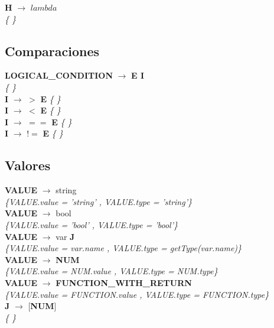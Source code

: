 \documentclass[10pt,a4paper]{article}
\begin{document}
\textbf{H} $\rightarrow$ $lambda$ \\
\textit{\{   \}} \\

\subsection{Comparaciones}
\textbf{LOGICAL\_CONDITION} $\rightarrow$ \textbf{E I} \\
\textit{\{   \}} \\

\textbf{I} $\rightarrow$ $>$ \textbf{E}
\textit{\{   \}} \\

\textbf{I} $\rightarrow$ $<$ \textbf{E}
\textit{\{   \}} \\

\textbf{I} $\rightarrow$ $==$ \textbf{E}
\textit{\{   \}} \\

\textbf{I} $\rightarrow$ $!=$ \textbf{E}
\textit{\{   \}} \\

\subsection{Valores}
\textbf{VALUE} $\rightarrow$ string \\
\textit{\{VALUE.value =  'string' , VALUE.type = 'string'\}} \\


\textbf{VALUE} $\rightarrow$ bool   \\
\textit{\{VALUE.value =  'bool' , VALUE.type = 'bool'\}} \\


\textbf{VALUE} $\rightarrow$ var \textbf{J} \\
\textit{\{VALUE.value =  var.name , VALUE.type = getType(var.name)\}} \\


\textbf{VALUE} $\rightarrow$ \textbf{NUM}   \\
\textit{\{VALUE.value =  NUM.value , VALUE.type = NUM.type\}} \\


\textbf{VALUE} $\rightarrow$ \textbf{FUNCTION\_WITH\_RETURN} \\
\textit{\{VALUE.value =  FUNCTION.value , VALUE.type = FUNCTION.type\}} \\

\textbf{J} $\rightarrow$ [\textbf{NUM}] \\
\textit{\{   \}} \\
\end{document}
